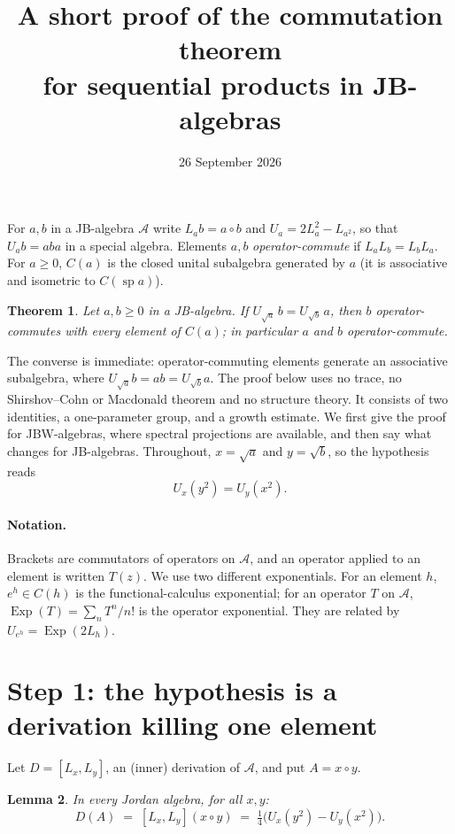 \documentclass[11pt]{article}
\title{A short proof of the commutation theorem\\ for sequential products in JB-algebras}
\author{}
\date{26 September 2026}
\newtheorem{theorem}{Theorem}
\newtheorem{lemma}[theorem]{Lemma}
\theoremstyle{remark}
\newcommand{\jp}{\circ}
\DeclareMathOperator{\Exp}{Exp}
\begin{document}
\maketitle

\noindent
For $a,b$ in a JB-algebra $\mathcal A$ write $L_a b = a\jp b$ and
$U_a = 2L_a^2 - L_{a^2}$, so that $U_a b = aba$ in a special algebra.
Elements $a,b$ \emph{operator-commute} if $L_aL_b = L_bL_a$.
For $a\geq 0$, $C(a)$ is the closed unital subalgebra generated by $a$
(it is associative and isometric to $C(\operatorname{sp} a)$).

\begin{theorem}
Let $a,b\geq 0$ in a JB-algebra. If $U_{\sqrt a}\, b = U_{\sqrt b}\, a$, then $b$
operator-commutes with every element of $C(a)$; in particular $a$ and $b$
operator-commute.
\end{theorem}

The converse is immediate: operator-commuting elements generate an associative
subalgebra, where $U_{\sqrt a} b = ab = U_{\sqrt b}a$.
The proof below uses no trace, no Shirshov--Cohn or Macdonald theorem and no
structure theory. It consists of two identities, a one-parameter group, and a
growth estimate.
We first give the proof for JBW-algebras, where spectral projections are
available, and then say what changes for JB-algebras.
Throughout, $x = \sqrt a$ and $y = \sqrt b$, so the hypothesis reads
\[
  U_x(y^2) = U_y(x^2).
\]

\paragraph{Notation.}
Brackets are commutators of operators on $\mathcal A$, and an operator applied
to an element is written $T(z)$.
We use two different exponentials.
For an element $h$, $e^{h}\in C(h)$ is the functional-calculus exponential;
for an operator $T$ on $\mathcal A$, $\Exp(T) = \sum_n T^n/n!$ is the operator
exponential.
They are related by $U_{e^{h}} = \Exp(2L_h)$.

\section*{Step 1: the hypothesis is a derivation killing one element}

Let $D = [L_x,L_y]$, an (inner) derivation of $\mathcal A$, and put $A = x\jp y$.

\begin{lemma}\label{lem:id1}
In every Jordan algebra, for all $x,y$:
\[
  D(A) \;=\; [L_x,L_y](x\jp y) \;=\; \tfrac14\bigl(U_x(y^2) - U_y(x^2)\bigr).
\]
\end{lemma}
\end{document}
